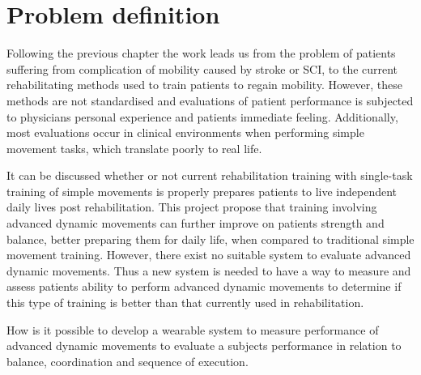 \section{Problem definition}

Following the previous chapter the work leads us from the problem of patients suffering from complication of mobility caused by stroke or SCI, to the current rehabilitating methods used to train patients to regain mobility. 
However, these methods are not standardised and evaluations of patient performance is subjected to physicians personal experience and patients immediate feeling. Additionally, most evaluations occur in clinical environments when performing simple movement tasks, which translate poorly to real life. 

It can be discussed whether or not current rehabilitation training with single-task training of simple movements is properly prepares patients to live independent daily lives post rehabilitation. This project propose that training involving advanced dynamic movements can further improve on patients strength and balance, better preparing them for daily life, when compared to traditional simple movement training. 
However, there exist no suitable system to evaluate advanced dynamic movements. Thus a new system is needed to have a way to measure and assess patients ability to perform advanced dynamic movements to determine if this type of training is better than that currently used in rehabilitation. 


\begin{center}
How is it possible to develop a wearable system to measure performance of advanced dynamic movements to evaluate a subjects performance in relation to balance, coordination and sequence of execution.
\end{center}
